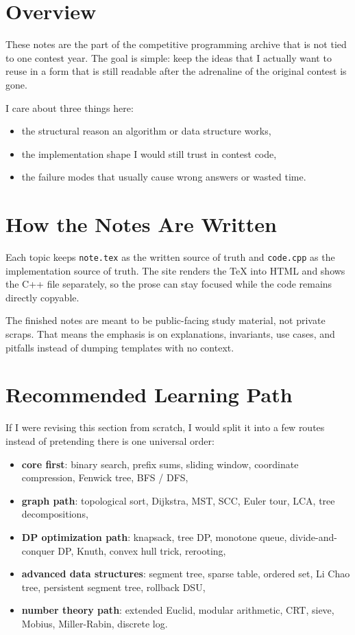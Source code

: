 \section*{Overview}

These notes are the part of the competitive programming archive that is not tied to one contest year.
The goal is simple: keep the ideas that I actually want to reuse in a form that is still readable after
the adrenaline of the original contest is gone.

I care about three things here:

\begin{itemize}
  \item the structural reason an algorithm or data structure works,
  \item the implementation shape I would still trust in contest code,
  \item the failure modes that usually cause wrong answers or wasted time.
\end{itemize}

\section*{How the Notes Are Written}

Each topic keeps \texttt{note.tex} as the written source of truth and \texttt{code.cpp} as the implementation
source of truth. The site renders the TeX into HTML and shows the C++ file separately, so the prose can stay
focused while the code remains directly copyable.

The finished notes are meant to be public-facing study material, not private scraps. That means the emphasis is
on explanations, invariants, use cases, and pitfalls instead of dumping templates with no context.

\section*{Recommended Learning Path}

If I were revising this section from scratch, I would split it into a few routes instead of pretending there is one
universal order:

\begin{itemize}
  \item \textbf{core first}: binary search, prefix sums, sliding window, coordinate compression, Fenwick tree, BFS / DFS,
  \item \textbf{graph path}: topological sort, Dijkstra, MST, SCC, Euler tour, LCA, tree decompositions,
  \item \textbf{DP optimization path}: knapsack, tree DP, monotone queue, divide-and-conquer DP, Knuth, convex hull trick, rerooting,
  \item \textbf{advanced data structures}: segment tree, sparse table, ordered set, Li Chao tree, persistent segment tree, rollback DSU,
  \item \textbf{number theory path}: extended Euclid, modular arithmetic, CRT, sieve, Mobius, Miller-Rabin, discrete log.
\end{itemize}

